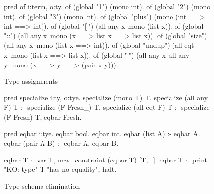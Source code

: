 \documentclass[a4paper, 11pt]{book}
\begin{document}
\begin{figure}
\begin{elpicode}
pred of i:term, o:ty.
of (global "1")      (mono int).
of (global "2")      (mono int).
of (global "3")      (mono int).
of (global "plus")   (mono (int ==> int ==> int)).
of (global "[]")    (all any x\ mono (list x)).
of (global "::")    (all any x\ mono (x ==> list x ==> list x)).
of (global "size")  (all any x\ mono (list x ==> int)).
of (global "undup") (all eqt x\ mono (list x ==> list x)).
of (global ",")     (all any x\ all any y\ mono (x ==> y ==> (pair x y))).
\end{elpicode}
\caption[type assignments]{Type assignments\label{hm:env}}
\end{figure}
  
\begin{figure}
\begin{elpicode}
pred specialize i:ty, o:tye.
specialize (mono T) T.
specialize (all any F) T :- specialize (F Fresh_) T.
specialize (all eqt F) T :- specialize (F Fresh) T, eqbar Fresh.

pred eqbar i:tye.
eqbar bool.
eqbar int.
eqbar (list A) :- eqbar A.
eqbar (pair A B) :- eqbar A, eqbar B.

eqbar T :- var T, new_constraint (eqbar T) [T,_].
eqbar T :- print "KO: type" T "has no equality", halt.
\end{elpicode}
\caption[schema elimination]{Type schema elimination\label{hm:elim}}
\end{figure}
\end{document}
